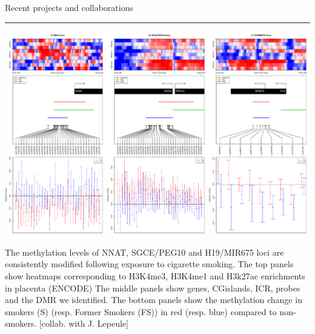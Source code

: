 \documentclass[final]{beamer}
\newlength{\twocolwid}
\begin{document}
\begin{frame}[t]
\begin{columns}[t]
\begin{column}{\twocolwid}
\begin{block}{Recent projects and collaborations}
\hrule

{
\centering
\mbox{\includegraphics[trim = 0mm 0mm 0mm 0mm, clip, width=.99\linewidth]{figs/fig_3loci}}

}

The methylation levels of NNAT, SGCE/PEG10 and H19/MIR675 loci are consistently modified following exposure to cigarette smoking.
The top panels show heatmaps corresponding to H3K4me3, H3K4me1 and H3k27ac enrichments in placenta (ENCODE)
The middle panels show genes, CGislands, ICR, probes and the DMR we identified.
The bottom panels show the methylation change in smokers (S) (resp. Former Smokers (FS)) in red (resp. blue) compared to non-smokers. [collab. with J. Lepeule]

\end{block}






\end{column}
\end{columns}
\end{frame}
\end{document}

